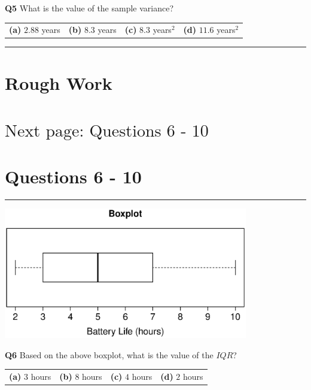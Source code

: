 \documentclass[12pt]{article}
\begin{document}
{\bf Q5} What is the value of the sample variance?\\[0.2cm]
\begin{tabular}{cccc}
{\bf(a)} $2.88$ years & {\bf(b)} $8.3$ years & {\bf(c)} $8.3$ years$^2$ & {\bf(d)} $11.6$ years$^2$ \\[0.6cm]
\end{tabular}

\quad

\rule{\linewidth}{1pt}

\newpage

\section*{Rough Work\\[23cm]}
\section*{\hspace{8cm}$\boxed{\text{Next page: Questions 6 - 10}}$}

\newpage


\section*{Questions 6 - 10}

\rule{\linewidth}{1pt}

\begin{center}
\includegraphics[width=0.8\textwidth, trim = 1.3cm 0.6cm 1cm 0.8cm, clip]{Boxplot}
\end{center}

{\bf Q6} Based on the above boxplot, what is the value of the $IQR$?\\[0.2cm]
\begin{tabular}{cccc}
{\bf(a)} $3$ hours & {\bf(b)} $8$ hours & {\bf(c)} $4$ hours & {\bf(d)} $2$ hours \\[0.6cm]
\end{tabular}
\end{document}
